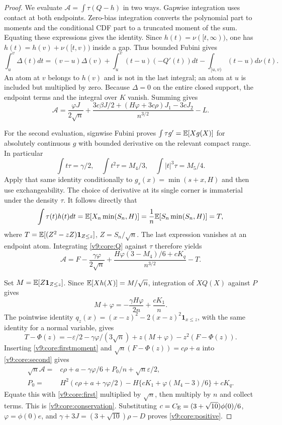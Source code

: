 \begin{proof}
We evaluate $\mathcal A=\int\tau(Q-h)$ in two ways. Gapwise integration
uses contact at both endpoints. Zero-bias integration converts the
polynomial part to moments and the conditional CDF part to a truncated
moment of the sum. Equating these expressions gives the identity.
Since $h(t)=\nu([t,\infty))$, one has
$h(t)=h(v)+\nu([t,v))$ inside a gap. Thus bounded Fubini gives
\[
 \int_u^v\Delta(t)dt=(v-u)\Delta(v)
 +\int_u^v(t-u)(-Q'(t))dt
 -\int_{[u,v)}(t-u)d\nu(t).
\]
An atom at $v$ belongs to $h(v)$ and is not in the last integral;
an atom at $u$ is included but multiplied by zero. Because $\Delta=0$ on the entire closed support, the endpoint terms
and the integral over $K$ vanish. Summing gives
\begin{equation}\label{v9:core:first}
 \mathcal A=\frac{\varphi J}{2\sqrt n}
 +\frac{3c\beta J/2+(H\varphi+3c\rho)J_1-3cJ_2}{n^{3/2}}-L.
\end{equation}

For the second evaluation, signwise Fubini proves
$\int\tau g'=\mathbb E[Xg(X)]$ for absolutely continuous $g$ with bounded
derivative on the relevant compact range. In particular
\[
 \int t\tau=\gamma/2,\quad \int t^2\tau=M_4/3,
 \quad\int |t|^3\tau=M_5/4.
\]
Apply that same identity conditionally to
$g_s(x)=\min(s+x,H)$ and then use exchangeability. The choice of
derivative at its single corner is immaterial under the density $\tau$.
It follows directly that
\[
 \int\tau(t)h(t)dt=\mathbb E[X_n\min(S_n,H)]
 =\frac1n\mathbb E[S_n\min(S_n,H)]
 =T,
\]
where $T=\mathbb E[(Z^2-zZ)\mathbf1_{Z\le z}]$, $Z=S_n/\sqrt n$.
The last expression vanishes at an endpoint atom. Integrating
\eqref{v9:core:Q} against $\tau$ therefore yields
\begin{equation}\label{v9:core:second}
 \mathcal A=F-\frac{\gamma\varphi}{2\sqrt n}
 +\frac{H\varphi(3-M_4)/6+cK_q}{n^{3/2}}-T.
\end{equation}

Set $M=\mathbb E[Z\mathbf1_{Z\le z}]$. Since
$\mathbb E[Xh(X)]=M/\sqrt n$, integration of $XQ(X)$ against $P$ gives
\begin{equation}\label{v9:core:firstmoment}
 M+\varphi=-\frac{\gamma H\varphi}{2n}+\frac{cK_1}{n}.
\end{equation}
The pointwise identity
$q_z(x)=(x-z)^2-2(x-z)^2\mathbf1_{x\le z}$, with the same identity
for a normal variable, gives
\[
 T-\Phi(z)=-\varepsilon/2-\gamma\varphi/(3\sqrt n)
              +z(M+\varphi)-z^2(F-\Phi(z)).
\]
Inserting \eqref{v9:core:firstmoment} and
$\sqrt n(F-\Phi(z))=c\rho+a$ into \eqref{v9:core:second} gives
\begin{align*}
 \sqrt n\mathcal A={}&c\rho+a-\gamma\varphi/6+P_0/n
                    +\sqrt n\varepsilon/2,\\
 P_0={}&H^2(c\rho+a+\gamma\varphi/2)
       -H\{cK_1+\varphi(M_4-3)/6\}+cK_q.
\end{align*}
Equate this with \eqref{v9:core:first} multiplied by $\sqrt n$,
then multiply by $n$ and collect terms. This is
\eqref{v9:core:conservation}. Substituting
$c=C_{\mathrm E}=(3+\sqrt{10})\phi(0)/6$, $\varphi=\phi(0)e$, and
$\gamma+3J=(3+\sqrt{10})\rho-D$ proves
\eqref{v9:core:positive}.
\end{proof}

